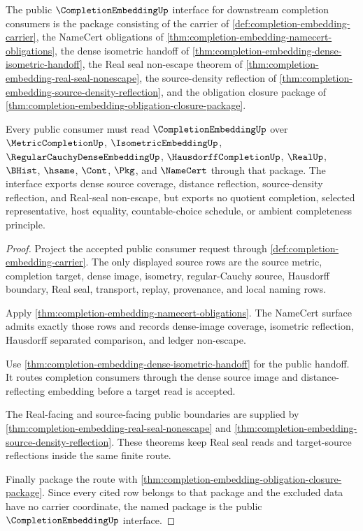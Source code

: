 \begin{theorem}
\label{thm:completion-embedding-public-interface}
The public $\CompletionEmbeddingUp$ interface for downstream completion consumers is the package consisting of the carrier of \autoref{def:completion-embedding-carrier}, the NameCert obligations of \autoref{thm:completion-embedding-namecert-obligations}, the dense isometric handoff of \autoref{thm:completion-embedding-dense-isometric-handoff}, the Real seal non-escape theorem of \autoref{thm:completion-embedding-real-seal-nonescape}, the source-density reflection of \autoref{thm:completion-embedding-source-density-reflection}, and the obligation closure package of \autoref{thm:completion-embedding-obligation-closure-package}.

Every public consumer must read $\CompletionEmbeddingUp$ over $\MetricCompletionUp$, $\IsometricEmbeddingUp$, $\RegularCauchyDenseEmbeddingUp$, $\HausdorffCompletionUp$, $\RealUp$, $\BHist$, $\hsame$, $\Cont$, $\Pkg$, and $\NameCert$ through that package. The interface exports dense source coverage, distance reflection, source-density reflection, and Real-seal non-escape, but exports no quotient completion, selected representative, host equality, countable-choice schedule, or ambient completeness principle.
\end{theorem}
\begin{proof}
Project the accepted public consumer request through \autoref{def:completion-embedding-carrier}. The only displayed source rows are the source metric, completion target, dense image, isometry, regular-Cauchy source, Hausdorff boundary, Real seal, transport, replay, provenance, and local naming rows.

Apply \autoref{thm:completion-embedding-namecert-obligations}. The NameCert surface admits exactly those rows and records dense-image coverage, isometric reflection, Hausdorff separated comparison, and ledger non-escape.

Use \autoref{thm:completion-embedding-dense-isometric-handoff} for the public handoff. It routes completion consumers through the dense source image and distance-reflecting embedding before a target read is accepted.

The Real-facing and source-facing public boundaries are supplied by \autoref{thm:completion-embedding-real-seal-nonescape} and \autoref{thm:completion-embedding-source-density-reflection}. These theorems keep Real seal reads and target-source reflections inside the same finite route.

Finally package the route with \autoref{thm:completion-embedding-obligation-closure-package}. Since every cited row belongs to that package and the excluded data have no carrier coordinate, the named package is the public $\CompletionEmbeddingUp$ interface.
\end{proof}

